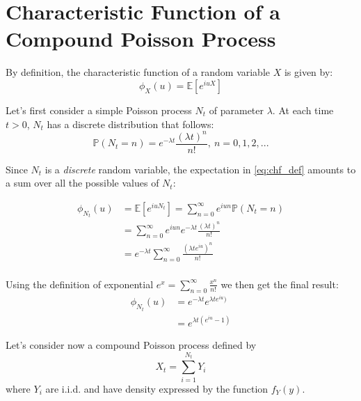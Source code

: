 \chapter{Characteristic Function of a Compound Poisson Process }
\label{app:A}


By definition, the characteristic function of a random variable $X$ is given by:
\begin{equation}
\label{eq:chf_def}
	\phi_{X}(u) = \mathbb{E}[e^{iuX}]
\end{equation}

Let's first consider a simple Poisson process $N_t$ of parameter $\lambda$. At each time $t >0$, $N_t$ has a discrete distribution that follows:
\begin{equation}
\mathbb{P}( N_t = n) = e^{-\lambda t}\frac{(\lambda t)^n}{n!} ,\: n = 0,1,2,...
\end{equation}

Since $N_t$ is a \textit{discrete} random variable, the expectation in \ref{eq:chf_def} amounts to a sum over all the possible values of $N_t$:

\begin{equation*} 
	\begin{split}
	\phi_{N_t}(u) & = \mathbb{E}[e^{iu N_t}] = \sum_{n=0}^{\infty} e^{iun} \mathbb{P}( N_t = n)\\
	&= \sum_{n=0}^{\infty}e^{iun}e^{-\lambda t}\frac{(\lambda t)^n}{n!}\\
	&= e^{-\lambda t} \sum_{n=0}^{\infty}\frac{(\lambda t e^{iu})^n}{n!}\\
	\end{split}
\end{equation*}

Using the definition of exponential $e^x  = \sum_{n=0}^{\infty} \frac{x^n}{n!}$ we then get the final result:
\begin{equation*} 
	\begin{split}
	\phi_{N_t}(u) & = e^{-\lambda t} e^{\lambda t e^{iu})}\\
	& = e^{\lambda t (e^{iu}-1)}
	\end{split}
\end{equation*}

Let's consider now a compound Poisson process defined by 
\begin{equation}
	X_t = \sum_{i=1}^{N_t} Y_i
\end{equation}
where $Y_i$ are i.i.d. and have density expressed by the function $f_Y(y)$.

